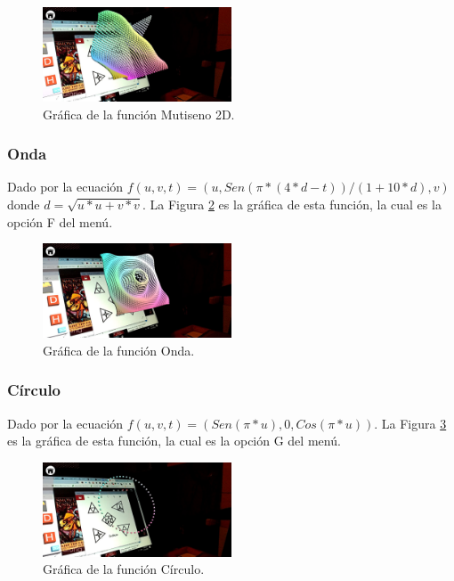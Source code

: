 \begin{figure}[hbt!]
\centering
\includegraphics[width=0.5\textwidth]{figuras/graficas/multiseno2d.png}
\caption{\label{fig:graf_multiseno2d}Gráfica de la función Mutiseno 2D.}
\end{figure}
\FloatBarrier

\subsubsection{Onda}
Dado por la ecuación $f(u,v,t)=(u, Sen(\pi * (4 * d - t))/(1 + 10 * d),v)$ donde $d=\sqrt{u * u + v * v}$. La Figura \ref{fig:graf_onda} es la gráfica de esta función, la cual es la opción F del menú.

\begin{figure}[hbt!]
\centering
\includegraphics[width=0.5\textwidth]{figuras/graficas/onda.png}
\caption{\label{fig:graf_onda}Gráfica de la función Onda.}
\end{figure}
\FloatBarrier

\subsubsection{Círculo}
Dado por la ecuación $f(u,v,t)=(Sen(\pi * u), 0,Cos(\pi * u))$. La Figura \ref{fig:graf_circulo} es la gráfica de esta función, la cual es la opción G del menú.

\begin{figure}[hbt!]
\centering
\includegraphics[width=0.5\textwidth]{figuras/graficas/circulo.png}
\caption{\label{fig:graf_circulo}Gráfica de la función Círculo.}
\end{figure}
\FloatBarrier

